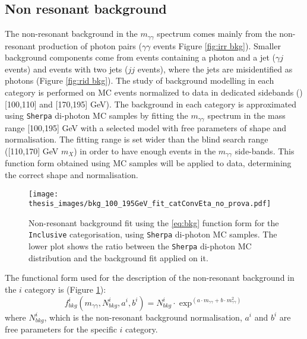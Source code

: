 \documentclass[a4paper, oneside, 11pt, openright]{book}
\begin{document}
 			\subsection{Non resonant background}
 				The non-resonant background in the $m_{\gamma\gamma}$ spectrum comes mainly from the non-resonant production of photon pairs ($\gamma\gamma$ events Figure \ref{fig:irr bkg}). Smaller background components come from events containing a photon and a jet ($\gamma j$ events) and events with two jets ($jj$ events), where the jets are misidentified as photons (Figure \ref{fig:rid bkg}). The study of background modelling in each category is performed on MC events normalized to data in dedicated sidebands ()[100,110] and [170,195] GeV). The background in each category is approximated using \texttt{Sherpa} di-photon MC samples by fitting the $m_{\gamma\gamma}$ spectrum in the mass range [100,195] GeV with a selected model with free parameters of shape and normalisation. The fitting range is set wider than the blind search range ([110,170] GeV $m_X$) in order to have enough events in the $m_{\gamma\gamma}$ side-bands. This function form obtained using MC samples will be applied to data, determining the correct shape and normalisation.
 				
 				\begin{figure}[h]
 					\centering
 					\texttt{[image: thesis\_images/bkg\_100\_195GeV\_fit\_catConvEta\_no\_prova.pdf]}
 					\caption{Non-resonant background fit using the \ref{eq:bkg} function form for the \texttt{Inclusive} categorisation, using  \texttt{Sherpa} di-photon MC samples. The lower plot shows the ratio between the \texttt{Sherpa} di-photon MC distribution and the background fit applied on it.}
 					\label{fig:bkg_fit}
 				\end{figure}
 				The functional form used for the description of the non-resonant background in the $i$ category is (Figure \ref{fig:bkg_fit}):
 				\begin{equation}\label{eq:bkg}
 					f^i_{bkg}(m_{\gamma\gamma},N_{bkg}^i,a^i,b^i) = N_{bkg}^i\cdot\exp^{(a\cdot m_{\gamma\gamma}+b\cdot m_{\gamma\gamma}^2)}
 				\end{equation}
 				where $N_{bkg}^i$, which is the non-resonant background normalisation, $a^i$ and $b^i$ are free parameters for the specific $i$ category.
 				
\end{document}
